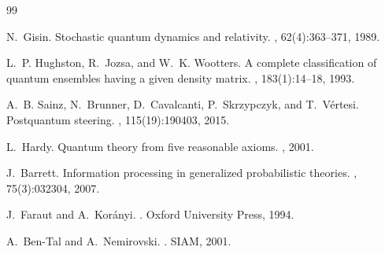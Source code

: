 \documentclass[11pt,a4paper]{article}
\theoremstyle{definition}
\begin{document}
\begin{thebibliography}{99}

N.~Gisin.
\newblock Stochastic quantum dynamics and relativity.
, 62(4):363--371, 1989.

L.~P. Hughston, R.~Jozsa, and W.~K. Wootters.
\newblock A complete classification of quantum ensembles having a given density matrix.
, 183(1):14--18, 1993.

A.~B. Sainz, N.~Brunner, D.~Cavalcanti, P.~Skrzypczyk, and T.~V\'ertesi.
\newblock Postquantum steering.
, 115(19):190403, 2015.

L.~Hardy.
\newblock Quantum theory from five reasonable axioms.
, 2001.

J.~Barrett.
\newblock Information processing in generalized probabilistic theories.
, 75(3):032304, 2007.

J.~Faraut and A.~Kor\'anyi.
.
\newblock Oxford University Press, 1994.

A.~Ben-Tal and A.~Nemirovski.
.
\newblock SIAM, 2001.

\end{thebibliography}
\end{document}

